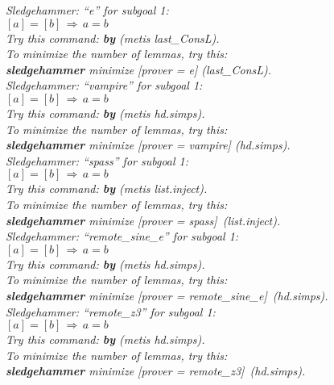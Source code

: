 \documentclass[a4paper,12pt]{article}
\begin{document}
\prew
\slshape
Sledgehammer: ``\textit{e}'' for subgoal 1: \\
$[a] = [b] \,\Longrightarrow\, a = b$ \\
Try this command: \textbf{by} (\textit{metis last\_ConsL}). \\
To minimize the number of lemmas, try this: \\
\textbf{sledgehammer} \textit{minimize} [\textit{prover} = \textit{e}] (\textit{last\_ConsL}). \\[3\smallskipamount]
%
Sledgehammer: ``\textit{vampire}'' for subgoal 1: \\
$[a] = [b] \,\Longrightarrow\, a = b$ \\
Try this command: \textbf{by} (\textit{metis hd.simps}). \\
To minimize the number of lemmas, try this: \\
\textbf{sledgehammer} \textit{minimize} [\textit{prover} = \textit{vampire}] (\textit{hd.simps}). \\[3\smallskipamount]
%
Sledgehammer: ``\textit{spass}'' for subgoal 1: \\
$[a] = [b] \,\Longrightarrow\, a = b$ \\
Try this command: \textbf{by} (\textit{metis list.inject}). \\
To minimize the number of lemmas, try this: \\
\textbf{sledgehammer} \textit{minimize} [\textit{prover} = \textit{spass}]~(\textit{list.inject}). \\[3\smallskipamount]
%
%
Sledgehammer: ``\textit{remote\_sine\_e}'' for subgoal 1: \\
$[a] = [b] \,\Longrightarrow\, a = b$ \\
Try this command: \textbf{by} (\textit{metis hd.simps}). \\
To minimize the number of lemmas, try this: \\
\textbf{sledgehammer} \textit{minimize} [\textit{prover} = \textit{remote\_sine\_e}]~(\textit{hd.simps}). \\[3\smallskipamount]
%
Sledgehammer: ``\textit{remote\_z3}'' for subgoal 1: \\
$[a] = [b] \,\Longrightarrow\, a = b$ \\
Try this command: \textbf{by} (\textit{metis hd.simps}). \\
To minimize the number of lemmas, try this: \\
\textbf{sledgehammer} \textit{minimize} [\textit{prover} = \textit{remote\_z3}]~(\textit{hd.simps}).
\postw
\end{document}
